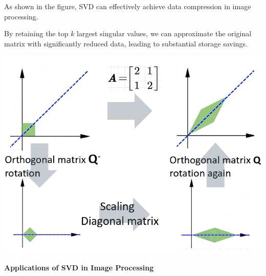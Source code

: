 \documentclass[a1paper,portrait,margin=0.8cm]{baposter}
\begin{document}
\begin{poster}
{\begin{minipage}[b]{0.48\textwidth}
\vspace{-1.5em}

As shown in the figure, SVD can effectively achieve data compression in image processing. 

\begin{minipage}[b]{0.43\textwidth}
By retaining the top $k$ largest singular values, we can approximate the original matrix with significantly reduced data, leading to substantial storage savings. 
\end{minipage}
\hfill
\begin{minipage}[b]{0.55\textwidth}
    \includegraphics[width=\linewidth+1em]{SVD.jpg}
\end{minipage}

\vspace{-0.8em}

\end{minipage}
\hfill
\begin{minipage}[b]{0.65\textwidth}

\vspace{0.1em}

\noindent \textbf{Applications of SVD in Image Processing} \\

\vspace{-4em}

\setlength{\arraycolsep}{2pt}


\end{minipage}}
\end{poster}
\end{document}
